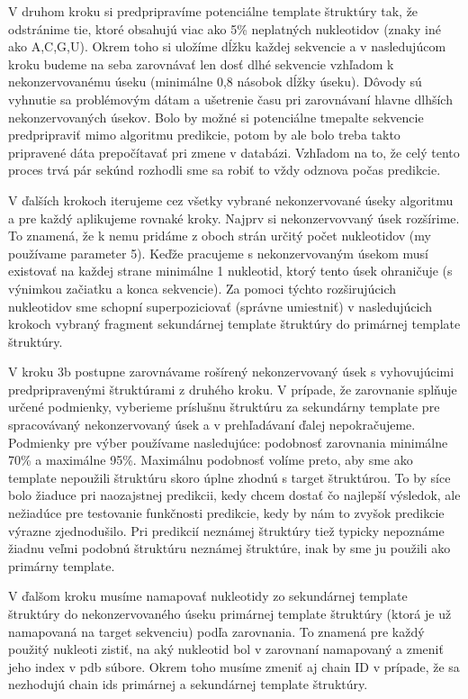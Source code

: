 \indent V druhom kroku si predpripravíme potenciálne template štruktúry tak, že odstránime tie, ktoré obsahujú viac ako 5\% neplatných nukleotidov (znaky iné ako A,C,G,U). Okrem toho si uložíme dĺžku každej sekvencie a v nasledujúcom kroku budeme na seba zarovnávať len dosť dlhé sekvencie vzhľadom k nekonzervovanému úseku (minimálne 0,8 násobok dĺžky úseku). Dôvody sú vyhnutie sa problémovým dátam a ušetrenie času pri zarovnávaní hlavne dlhších nekonzervovaných úsekov. Bolo by možné si potenciálne tmepalte sekvencie predpripraviť mimo algoritmu predikcie, potom by ale bolo treba takto pripravené dáta prepočítavať pri zmene v databázi. Vzhľadom na to, že celý tento proces trvá pár sekúnd rozhodli sme sa robiť to vždy odznova počas predikcie.


\indent V ďalších krokoch iterujeme cez všetky vybrané nekonzervované úseky algoritmu a pre každý aplikujeme rovnaké kroky. Najprv si nekonzervovvaný úsek rozšírime. To znamená, že k nemu pridáme z oboch strán určitý počet nukleotidov (my používame parameter 5). Keďže pracujeme s nekonzervovaným úsekom musí existovať na každej strane minimálne 1 nukleotid, ktorý tento úsek ohraničuje (s výnimkou začiatku a konca sekvencie). Za pomoci týchto rozširujúcich nukleotidov sme schopní superpoziciovať (správne umiestniť) v nasledujúcich krokoch vybraný fragment sekundárnej template štruktúry do primárnej template štruktúry.


\indent V  kroku 3b postupne zarovnávame rošírený nekonzervovaný úsek s vyhovujúcimi predpripravenými štruktúrami z druhého kroku. V prípade, že zarovnanie splňuje určené podmienky, vyberieme príslušnu štruktúru za sekundárny template  pre spracovávaný nekonzervovaný úsek a v prehľadávaní ďalej nepokračujeme. Podmienky pre výber používame nasledujúce: podobnosť zarovnania minimálne 70\% a maximálne 95\%. Maximálnu podobnosť volíme preto, aby sme ako template nepoužili štruktúru skoro úplne zhodnú s target štruktúrou. To by síce bolo žiaduce pri naozajstnej predikcii, kedy chcem dostať čo najlepší výsledok, ale nežiadúce pre testovanie funkčnosti predikcie, kedy by nám to zvyšok predikcie výrazne zjednodušilo. Pri predikcií neznámej štruktúry tiež typicky nepoznáme žiadnu veľmi podobnú štruktúru neznámej štruktúre, inak by sme ju použili ako primárny template. 


\indent V ďalšom kroku musíme namapovať nukleotidy zo sekundárnej template štruktúry do nekonzervovaného úseku primárnej template štruktúry (ktorá je už namapovaná na target sekvenciu) podľa zarovnania. To znamená pre každý použitý nukleoti zistiť, na aký nukleotid bol v zarovnaní namapovaný a zmeniť jeho index v pdb súbore. Okrem toho musíme zmeniť aj chain ID v prípade, že sa nezhodujú chain ids primárnej a sekundárnej template štruktúry.


